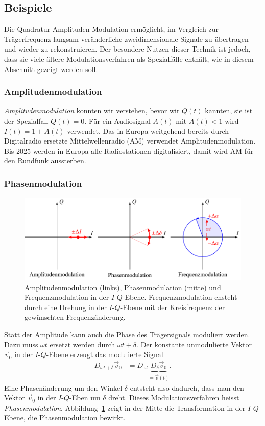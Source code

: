 %
%
%
\subsection{Beispiele
\label{subsection:qam:beispiele}}
Die Quadratur-Amplituden-Modulation ermöglicht, im Vergleich zur
Trägerfrequenz langsam veränderliche zweidimensionale Signale zu
übertragen und wieder zu rekonstruieren.
Der besondere Nutzen dieser Technik ist jedoch, dass sie viele
ältere Modulationsverfahren als Spezialfälle enthält, wie in
diesem Abschnitt gezeigt werden soll.

\subsubsection{Amplitudenmodulation}
{\em Amplitudenmodulation} konnten wir verstehen, bevor wir $Q(t)$ kannten,
sie ist der Spezialfall $Q(t)=0$.
Für ein Audiosignal $A(t)$ mit $A(t)<1$ wird $I(t)=1+A(t)$ verwendet.
Das in Europa weitgehend bereits durch Digitalradio ersetzte 
Mittelwellenradio (AM) verwendet Amplitudenmodulation.
Bis 2025 werden in Europa alle Radiostationen digitalisiert, damit
wird AM für den Rundfunk aussterben.

\subsubsection{Phasenmodulation}
\begin{figure}
\centering
\includegraphics{applications/qam/images/amfmpm.pdf}
\caption{Amplitudenmodulation (links), Phasenmodulation (mitte) und
Frequenzmodulation in der $I$-$Q$-Ebene.
Frequenzmodulation ensteht durch eine Drehung in der $I$-$Q$-Ebene
mit der Kreisfrequenz der gewünschten Frequenzänderung.
\label{qam:figure:amfmpm}}
\end{figure}
Statt der Amplitude kann auch die Phase des Trägersignals moduliert werden.
Dazu muss $\omega t$ ersetzt werden durch $\omega t + \delta$.
Der konstante unmodulierte Vektor $\vec{v}_0$ in der $I$-$Q$-Ebene erzeugt
das modulierte Signal
\begin{align*}
D_{\omega t + \delta}
\vec{v}_0
&=
D_{\omega t}\underbrace{D_{\delta} \vec{v}_0}_{\displaystyle=\vec{v}(t)}.
\end{align*}
Eine Phasenänderung um den Winkel $\delta$ entsteht also dadurch, dass
man den Vektor $\vec{v}_0$ in der $I$-$Q$-Eben um $\delta$ dreht.
Dieses Modulationsverfahren heisst {\em Phasenmodulation}.
Abbildung~\ref{qam:figure:amfmpm} zeigt in der Mitte die Transformation
in der $I$-$Q$-Ebene, die Phasenmodulation bewirkt.

